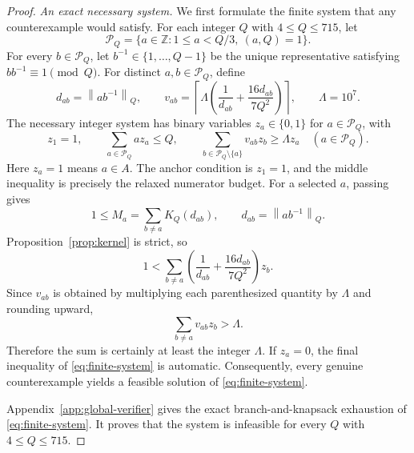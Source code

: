 \documentclass[11pt]{article}
\theoremstyle{definition}
\theoremstyle{remark}
\newcommand{\Z}{\mathbb Z}
\newcommand{\normQ}[1]{\left\lVert #1\right\rVert_Q}
\begin{document}
\begin{proof}
\noindent\emph{An exact necessary system.}
We first formulate the finite system that any counterexample would satisfy.
For each integer
\(Q\) with \(4\le Q\le715\), let
\[
 \mathcal P_Q=\{a\in\Z:1\le a<Q/3,\ (a,Q)=1\}.
\]
For every \(b\in\mathcal P_Q\), let
\(b^{-1}\in\{1,\ldots,Q-1\}\) be the unique representative satisfying
\(bb^{-1}\equiv1\pmod Q\).  For distinct
\(a,b\in\mathcal P_Q\), define
\[
 d_{ab}=\normQ{ab^{-1}},\qquad
 v_{ab}=\left\lceil \Lambda\left(\frac1{d_{ab}}
 +\frac{16d_{ab}}{7Q^2}\right)\right\rceil,
 \qquad \Lambda=10^7.
\]
The necessary integer system has binary variables
\(z_a\in\{0,1\}\) for \(a\in\mathcal P_Q\), with
\begin{equation}\label{eq:finite-system}
 z_1=1,\qquad
 \sum_{a\in\mathcal P_Q}az_a\le Q,
 \qquad
 \sum_{b\in\mathcal P_Q\setminus\{a\}}v_{ab}z_b
 \ge \Lambda z_a\quad(a\in\mathcal P_Q).
\end{equation}
Here \(z_a=1\) means \(a\in A\).  The anchor condition is \(z_1=1\),
and the middle inequality is precisely the relaxed numerator budget.  For a
selected \(a\), passing gives
\[
 1\le M_a=\sum_{b\ne a}K_Q(d_{ab}),
 \qquad d_{ab}=\normQ{ab^{-1}}.
\]
Proposition~\ref{prop:kernel} is strict, so
\[
 1<\sum_{b\ne a}
 \left(\frac1{d_{ab}}+\frac{16d_{ab}}{7Q^2}\right)z_b.
\]
Since \(v_{ab}\) is obtained by multiplying each parenthesized quantity by
\(\Lambda\) and rounding upward,
\[
 \sum_{b\ne a}v_{ab}z_b>\Lambda.
\]
Therefore the sum is certainly at least the integer \(\Lambda\).  If
\(z_a=0\), the final
inequality of \eqref{eq:finite-system} is automatic.  Consequently,
every genuine counterexample yields a feasible solution of
\eqref{eq:finite-system}.

Appendix~\ref{app:global-verifier} gives the exact branch-and-knapsack
exhaustion of \eqref{eq:finite-system}.  It proves that the system is
infeasible for every \(Q\) with \(4\le Q\le715\).


\end{proof}
\end{document}
